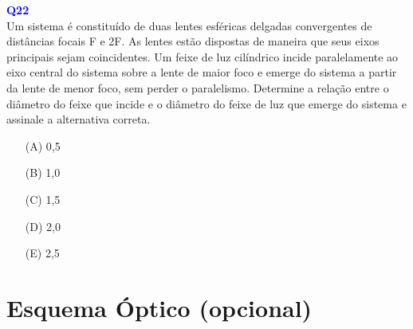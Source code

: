 \documentclass[a4paper,12pt]{article}
\begin{document}
\begin{flushleft}
\textbf{\textcolor{blue}{\Large Q22}}\\

Um sistema é constituído de duas lentes esféricas delgadas convergentes de distâncias focais F e
2F. As lentes estão dispostas de maneira que seus eixos principais sejam coincidentes. Um
feixe de luz cilíndrico incide paralelamente ao eixo central do sistema sobre a lente de maior foco e
emerge do sistema a partir da lente de menor foco, sem perder o paralelismo. Determine a
relação entre o diâmetro do feixe que incide e o diâmetro do feixe de luz que emerge do sistema e
assinale a alternativa correta.


\begin{itemize}
\item[(A)] 0{,}5
\item[(B)] 1,0
\item[(C)] 1,5
\item[(D)] 2,0
\item[(E)] 2,5
\end{itemize}

\vspace{0.5cm}

\section*{Esquema Óptico (opcional)}

\begin{center}
\end{center}
\end{flushleft}
\end{document}
